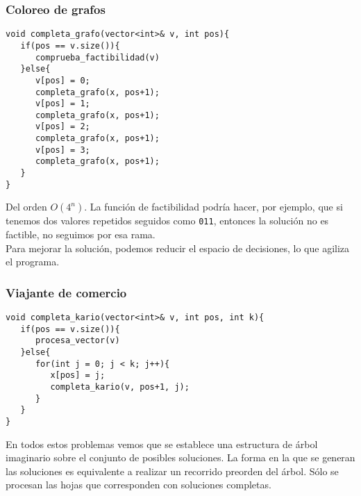 \subsubsection{Coloreo de grafos}
\begin{verbatim}
void completa_grafo(vector<int>& v, int pos){
   if(pos == v.size()){
      comprueba_factibilidad(v)
   }else{
      v[pos] = 0;
      completa_grafo(x, pos+1);
      v[pos] = 1;
      completa_grafo(x, pos+1);
      v[pos] = 2;
      completa_grafo(x, pos+1);
      v[pos] = 3;
      completa_grafo(x, pos+1);
   }
}
\end{verbatim}
Del orden $O(4^n)$. La función de factibilidad podría hacer, por ejemplo, que si tenemos dos valores repetidos seguidos como \verb|011|, entonces la solución no es factible, no seguimos por esa rama.\\

Para mejorar la solución, podemos reducir el espacio de decisiones, lo que agiliza el programa.

\subsubsection{Viajante de comercio}
\begin{verbatim}
void completa_kario(vector<int>& v, int pos, int k){
   if(pos == v.size()){
      procesa_vector(v)
   }else{
      for(int j = 0; j < k; j++){
         x[pos] = j;
         completa_kario(v, pos+1, j);
      }
   }
}
\end{verbatim}

En todos estos problemas vemos que se establece una estructura de árbol imaginario sobre el conjunto de posibles soluciones. La forma en la que se generan las soluciones es equivalente a realizar un recorrido preorden del árbol. Sólo se procesan las hojas que corresponden con soluciones completas.


